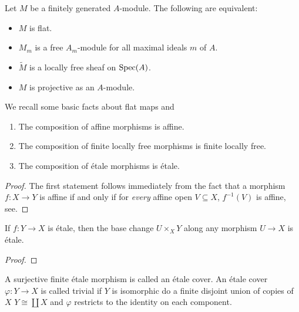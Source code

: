\begin{theorem}
	Let $M$ be a finitely generated $A$-module. The following are equivalent:
	\begin{itemize}
		\item $M$ is flat.
		\item $M_m$ is a free $A_m$-module for all maximal ideals $m$ of $A$.
		\item $\widetilde{M}$ is a locally free sheaf on $\operatorname{Spec}(A)$.
		\item $M$ is projective as an $A$-module.
	\end{itemize}
\end{theorem}

We recall some basic facts about flat maps and
\begin{lemma}
	\begin{enumerate}
		\item The composition of affine morphisms is affine.
		\item The composition of finite locally free morphisms is finite locally free.
		\item The composition of \'etale morphisms is \'etale.
	\end{enumerate}
\end{lemma}

\begin{proof}
	The first statement follows immediately from the fact that a morphism $f: X \to Y$ is affine if and only if for \textit{every} affine open $V \subseteq X$, $f^{-1}(V)$ is affine, see\cite{Hartshorne}.
\end{proof}

\begin{lemma}
	If $f: Y \to X$ is \'etale, then the base change $U \times_X Y$ along any morphism $U \to X$ is \'etale.
\end{lemma}

\begin{proof}

\end{proof}

\begin{definition}
	A surjective finite \'etale morphism is called an \'etale cover. An \'etale cover $\varphi : Y \to X$ is called trivial if $Y$ is isomorphic do a finite disjoint union of copies of $X$ $Y \cong \coprod X$ and $\varphi$ restricts to the identity on each component.
\end{definition}

